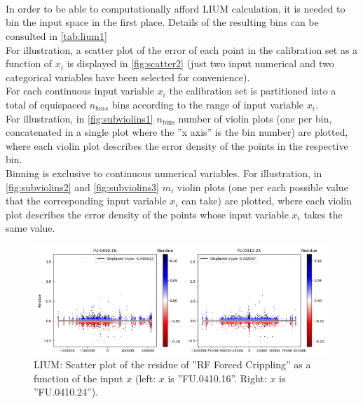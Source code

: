 \paragraph{ \\}
In order to be able to computationally afford LIUM calculation, it is needed to bin the input space in the first place. Details of the resulting bins can be consulted in \autoref{tab:lium1}\\
\indent For illustration, a scatter plot of the error of each point in the calibration set as a function of $x_i$ is displayed in \autoref{fig:scatter2} (just two input numerical and two categorical variables have been selected for convenience).\\
\indent For each continuous input variable $x_i$ the calibration set is partitioned into a total of equispaced $n_{bins}$ bins according to the range of input variable $x_i$.\\
\indent For illustration, in \autoref{fig:subviolins1} $n_{\text{bins}}$ number of violin plots (one per bin, concatenated in a single plot where the ''x axis'' is the bin number) are plotted, where each violin plot describes the error density of the points in the respective bin.\\
\indent Binning is exclusive to continuous numerical variables. For illustration, in \autoref{fig:subviolins2} and \autoref{fig:subviolins3} $m_i$ violin plots (one per each possible value that the corresponding input variable $x_i$ can take) are plotted, where each violin plot describes the error density of the points whose input variable $x_i$ takes the same value.\\
%
\begin{figure}[!htb]
	\centering
	\includegraphics[width=\textwidth]{Figures/uncertainty/scatter2.png}
	\caption{LIUM: Scatter plot of the residue of ''RF Forced Crippling'' as a function of the input $x$ (left: $x$ is ''FU.0410.16''. Right: $x$ is ''FU.0410.24'').}
	\label{fig:scatter2}
\end{figure}

